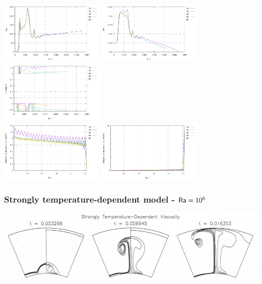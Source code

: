 \begin{center}
\includegraphics[width=5cm]{python_codes/fieldstone_106/results/axi/vrms2}
\includegraphics[width=5cm]{python_codes/fieldstone_106/results/axi/Tavrg2}
\includegraphics[width=5cm]{python_codes/fieldstone_106/results/axi/stats_T2}\\
\includegraphics[width=5cm]{python_codes/fieldstone_106/results/axi/profile_T2}
\includegraphics[width=5cm]{python_codes/fieldstone_106/results/axi/profile_eta2}
\end{center}




\newpage
\subsubsection*{Strongly temperature-dependent model - ${\mathsf{Ra}}=10^6$}
\begin{center}
\includegraphics[width=15cm]{python_codes/fieldstone_106/images/keki97d}
\end{center}


